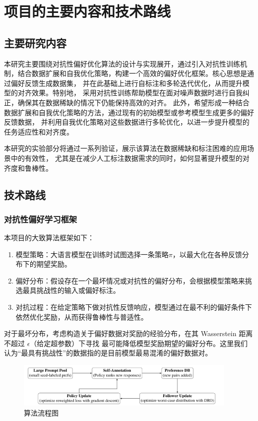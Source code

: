 \section{项目的主要内容和技术路线}

\subsection{主要研究内容}

本研究主要围绕对抗性偏好优化算法的设计与实现展开，通过引入对抗性训练机制，结合数据扩展和自我优化策略，构建一个高效的偏好优化框架。核心思想是通过偏好反馈生成数据集，
并在此基础上进行自标注和多轮迭代优化，从而提升模型的对齐效果。特别地，
采用对抗性训练帮助模型在面对噪声数据时进行自我纠正，确保其在数据稀缺的情况下仍能保持高效的对齐。
此外，希望形成一种结合数据扩展和自我优化策略的方法，通过现有的初始模型或参考模型生成更多的偏好反馈数据，
并利用自我优化策略对这些数据进行多轮优化，以进一步提升模型的任务适应性和对齐度。

本研究的实验部分将通过一系列验证，展示该算法在数据稀缺和标注困难的应用场景中的有效性，
尤其是在减少人工标注数据需求的同时，如何显著提升模型的对齐度和鲁棒性。

\subsection{技术路线}

\subsubsection{对抗性偏好学习框架}

本项目的大致算法框架如下：
\begin{enumerate}
    \item 模型策略：大语言模型在训练时试图选择一条策略$\pi$，以最大化在各种反馈分布下的期望奖励。
    \item 偏好分布：假设存在一个最坏情况或对抗性的偏好分布，会根据模型策略来挑选最具挑战性的输入或偏好标注。
    \item 对抗过程：在给定策略下做对抗性反馈响应，模型通过在最不利的偏好条件下依然优化奖励，从而获得鲁棒性与普适性。
\end{enumerate}
对于最坏分布，考虑构造关于偏好数据对奖励的经验分布，在其 Wasserstein 距离不超过 $\epsilon$（给定超参数）下寻找
最可能降低模型奖励期望的偏好分布。这里我们认为“最具有挑战性”的数据指的是目前模型最易混淆的偏好数据对。

\begin{figure}[h]
    \centering
    \includegraphics[width=0.95\textwidth]{figure/SSAPO.png}
    \caption{算法流程图}
\end{figure}

